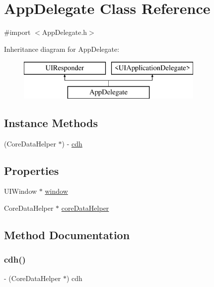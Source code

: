 \hypertarget{interface_app_delegate}{}\section{App\+Delegate Class Reference}
\label{interface_app_delegate}


{\ttfamily \#import $<$App\+Delegate.\+h$>$}

Inheritance diagram for App\+Delegate\+:\begin{figure}[H]
\begin{center}
\leavevmode
\includegraphics[height=2.000000cm]{interface_app_delegate}
\end{center}
\end{figure}
\subsection*{Instance Methods}
\begin{DoxyCompactItemize}
\item 
(Core\+Data\+Helper $\ast$) -\/ \hyperlink{interface_app_delegate_a36b75aa30b697be2484c2b152a4e119e}{cdh}
\end{DoxyCompactItemize}
\subsection*{Properties}
\begin{DoxyCompactItemize}
\item 
U\+I\+Window $\ast$ \hyperlink{interface_app_delegate_acf48ac24125e688cac1a85445cd7fac2}{window}
\item 
Core\+Data\+Helper $\ast$ \hyperlink{interface_app_delegate_a492a9bd7c20c991d0a3c2fa2a9a69d44}{core\+Data\+Helper}
\end{DoxyCompactItemize}


\subsection{Method Documentation}
\hypertarget{interface_app_delegate_a36b75aa30b697be2484c2b152a4e119e}{}\label{interface_app_delegate_a36b75aa30b697be2484c2b152a4e119e} 
\subsubsection{\texorpdfstring{cdh()}{cdh()}}
{\footnotesize\ttfamily -\/ (Core\+Data\+Helper $\ast$) cdh \begin{DoxyParamCaption}{ }\end{DoxyParamCaption}}



